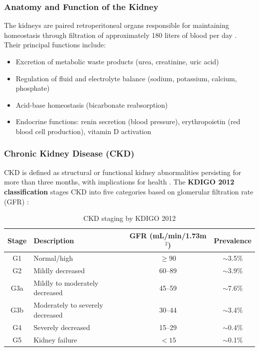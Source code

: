 \documentclass[12pt,a4paper,twoside]{report}
\begin{document}
\subsubsection{Anatomy and Function of the Kidney}

The kidneys are paired retroperitoneal organs responsible for maintaining homeostasis through filtration of approximately 180 liters of blood per day \cite{brenner_kidney_2020}. Their principal functions include:
\begin{itemize}
  \item Excretion of metabolic waste products (urea, creatinine, uric acid)
  \item Regulation of fluid and electrolyte balance (sodium, potassium, calcium, phosphate)
  \item Acid-base homeostasis (bicarbonate reabsorption)
  \item Endocrine functions: renin secretion (blood pressure), erythropoietin (red blood cell production), vitamin D activation \cite{kdigo2015}
\end{itemize}

\subsubsection{Chronic Kidney Disease (CKD)}

CKD is defined as structural or functional kidney abnormalities persisting for more than three months, with implications for health \cite{kdigo2015}. The \textbf{KDIGO 2012 classification} stages CKD into five categories based on glomerular filtration rate (GFR) \cite{kdigo2015}:

\begin{table}[htbp]
\centering
\caption{CKD staging by KDIGO 2012}
\label{tab:ckd_stages}
\begin{tabular}{clcc}
\toprule
\textbf{Stage} & \textbf{Description} & \textbf{GFR (mL/min/1.73m$^2$)} & \textbf{Prevalence} \\
\midrule
G1 & Normal/high & $\geq 90$ & $\sim$3.5\% \\
G2 & Mildly decreased & 60--89 & $\sim$3.9\% \\
G3a & Mildly to moderately decreased & 45--59 & $\sim$7.6\% \\
G3b & Moderately to severely decreased & 30--44 & $\sim$3.4\% \\
G4 & Severely decreased & 15--29 & $\sim$0.4\% \\
G5 & Kidney failure & $<15$ & $\sim$0.1\% \\
\bottomrule
\end{tabular}
\end{table}
\end{document}
